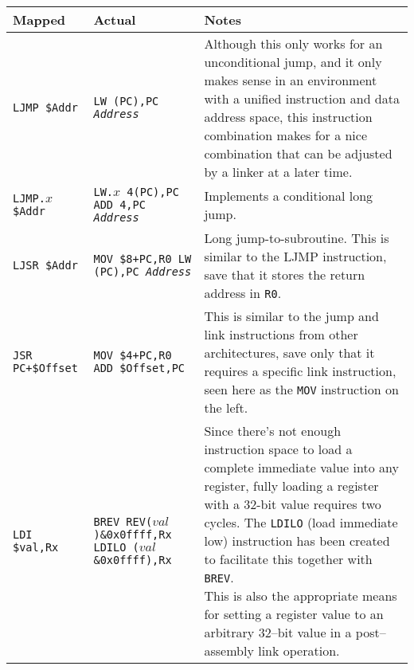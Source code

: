 \documentclass{gqtekspec}
\begin{document}
\begin{table}\begin{center}
\begin{tabular}{p{1.1in}p{1.8in}p{3in}}\\\hline
Mapped & Actual  & Notes \\\hline
{\tt LJMP \$Addr}
	& \parbox[t]{1.5in}{\tt LW (PC),PC \\ {\em Address }}
	& Although this only works for an unconditional jump, and it only
	makes sense in an environment with a unified instruction and data
	address space, this instruction combination makes for a nice
	combination that can be adjusted by a linker at a later time.\\\hline
{\tt LJMP.$x$ \$Addr}
	& \parbox[t]{1.5in}{\tt LW.$x$ 4(PC),PC \\ ADD 4,PC \\ {\em Address }}
	& Implements a conditional long jump.\\\hline
{\tt LJSR \$Addr  }
	& \parbox[t]{1.5in}{\tt MOV \$8+PC,R0 \\ LW (PC),PC \\ {\em Address}}
	& Long jump-to-subroutine.  This is similar to the LJMP instruction,
	save that it stores the return address in {\tt R0}.
	\\\hline
{\tt JSR PC+\$Offset  }
	& \parbox[t]{1.5in}{\tt MOV \$4+PC,R0 \\ ADD \$Offset,PC}
	& This is similar to the jump and link instructions from other
	architectures, save only that it requires a specific link
	instruction, seen here as the {\tt MOV} instruction on the
	left.\\\hline
{\tt LDI \$val,Rx }
	& \parbox[t]{1.8in}{\tt BREV REV($val$)\&0x0ffff,Rx \\
			LDILO ($val$\&0x0ffff),Rx}
	& \parbox[t]{3.0in}{Since there's not enough instruction
		space to load a complete immediate value into any register,
		fully loading a register with a 32-bit value requires two
		cycles.  The {\tt LDILO} (load immediate low) instruction
		has been created to facilitate this together with {\tt BREV}.
		\\
	This is also the appropriate means for setting a register value
	to an arbitrary 32--bit value in a post--assembly link
	operation.}\\\hline

\end{tabular}
\end{center}
\end{table}
\end{document}
